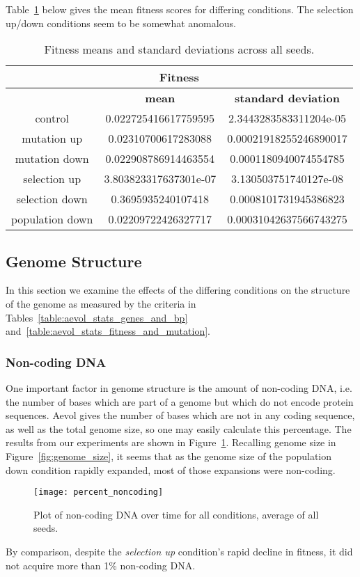 Table~\ref{table:fitness_means_std_dev} below gives the mean fitness scores for differing conditions. The selection up/down conditions seem to be somewhat anomalous.
\begin{table}[H]
	\centering
	\begin{tabular}{|c||c|c|}
		\hline
		\multicolumn{3}{|c|}{\Large \textbf{Fitness}} \\
		\hline
		& \textbf{mean} & \textbf{standard deviation} \\
		\hline \hline
		control & 0.022725416617759595 & 2.3443283583311204e-05 \\
		\hline
		mutation up & 0.02310700617283088 & 0.00021918255246890017 \\
		\hline
		mutation down & 0.022908786914463554 & 0.0001180940074554785 \\
		\hline
		selection up & 3.803823317637301e-07 & 3.130503751740127e-08 \\
		\hline
		selection down & 0.3695935240107418	& 0.0008101731945386823 \\
		\hline
		population down & 0.02209722426327717 & 0.00031042637566743275 \\
		\hline
	\end{tabular}
	\caption[Fitness means and standard deviations.]{Fitness means and standard deviations across all seeds. }
	\label{table:fitness_means_std_dev}
\end{table}

\subsection{Genome Structure}
In this section we examine the effects of the differing conditions on the structure of the genome as measured by the criteria in Tables~\ref{table:aevol_stats_genes_and_bp} and~\ref{table:aevol_stats_fitness_and_mutation}. 

\subsubsection{Non-coding DNA}
One important factor in genome structure is the amount of non-coding DNA, i.e. the number of bases which are part of a genome but which do not encode protein sequences. Aevol gives the number of bases which are not in any coding sequence, as well as the total genome size, so one may easily calculate this percentage. The results from our experiments are shown in Figure~\ref{fig:mean_non-coding_DNA}. Recalling genome size in Figure~\ref{fig:genome_size}, it seems that as the genome size of the population down condition rapidly expanded, most of those expansions were non-coding.
\begin{figure}[H]
	\centering
	\texttt{[image: percent\_noncoding]}
	\caption[Non-coding DNA]{Plot of non-coding DNA over time for all conditions, average of all seeds.}
	\label{fig:mean_non-coding_DNA}
\end{figure}
By comparison, despite the \textit{selection up} condition's rapid decline in fitness, it did not acquire more than 1\% non-coding DNA. 

